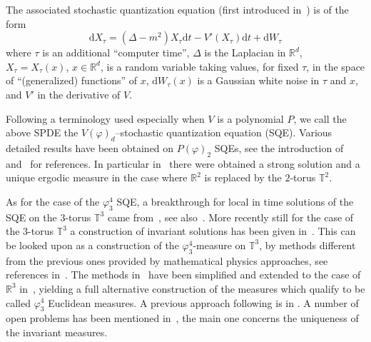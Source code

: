 \documentclass[a4paper,10pt]{article}
\newcommand{\mathd}{\mathrm{d}}
\begin{document}
The associated stochastic quantization equation (first introduced
in~{\cite{parisi_perturbation_1981}}) is of the form
\[ \mathd X_{\tau} = (\Delta - m^2) X_{\tau} \mathd t - V' (X_{\tau}) \mathd
   t + \mathd W_{\tau} \]
where $\tau$ is an additional ``computer time'', $\Delta$ is the Laplacian in
$\mathbb{R}^d$, $X_{\tau} = X_{\tau} (x)$, $x \in \mathbb{R}^d$, is a random
variable taking values, for fixed $\tau$, in the space of ``(generalized)
functions'' of $x$, $\mathd W_{\tau} (x)$ is a Gaussian white noise in $\tau$
and $x$, and $V'$ in the derivative of $V$.

Following a terminology used especially when $V$ is a polynomial $P$, we call
the above SPDE the $V (\varphi)_d$--stochastic quantization equation (SQE).
Various detailed results have been obtained on $P (\varphi)_2$ SQEs, see the
introduction of~{\cite{albeverio_invariant_2017}}
and~{\cite{gubinelli_pde_2018,GH18}} for references. In particular
in~{\cite{da_prato_strong_2003}} there were obtained a strong solution and a
unique ergodic measure in the case where $\mathbb{R}^2$ is replaced by the
$2$-torus $\mathbb{T}^2$.

As for the case of the $\varphi^4_3$ SQE, a breakthrough for local in time
solutions of the SQE on the $3$-torus $\mathbb{T}^3$ came
from~{\cite{Hairer2014}}, see also~{\cite{CaCh,GuImPe}}. More recently still
for the case of the $3$-torus $\mathbb{T}^3$ a construction of invariant
solutions has been given in~{\cite{albeverio_invariant_2017}}. This can be
looked upon as a construction of the $\varphi^4_3$-measure on $\mathbb{T}^3$,
by methods different from the previous ones provided by mathematical physics
approaches, see references in~{\cite{Glimm1987}}. The methods
in~{\cite{albeverio_invariant_2017}} have been simplified and extended to the
case of $\mathbb{R}^3$ in~{\cite{gubinelli_pde_2018}}, yielding a full
alternative construction of the measures which qualify to be called
$\varphi^4_3$ Euclidean measures. A previous approach following
{\cite{Hairer2014}} is in {\cite{MoWe}}. A number of open problems has been
mentioned in~{\cite{albeverio_invariant_2017,gubinelli_pde_2018}}, the main
one concerns the uniqueness of the invariant measures.
\end{document}
